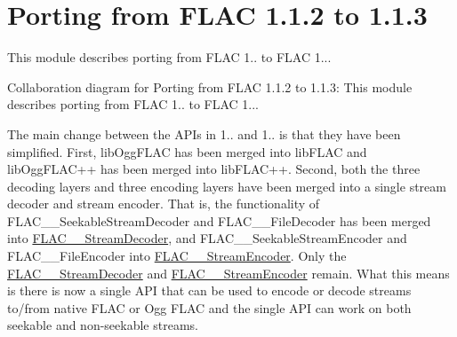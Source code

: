 \hypertarget{group__porting__1__1__2__to__1__1__3}{}\section{Porting from F\+L\+AC 1.1.2 to 1.1.3}
\label{group__porting__1__1__2__to__1__1__3}


This module describes porting from F\+L\+AC 1.. to F\+L\+AC 1...  


Collaboration diagram for Porting from F\+L\+AC 1.1.2 to 1.1.3\+:
This module describes porting from F\+L\+AC 1.. to F\+L\+AC 1... 

The main change between the A\+P\+Is in 1.. and 1.. is that they have been simplified. First, lib\+Ogg\+F\+L\+AC has been merged into lib\+F\+L\+AC and lib\+Ogg\+F\+L\+A\+C++ has been merged into lib\+F\+L\+A\+C++. Second, both the three decoding layers and three encoding layers have been merged into a single stream decoder and stream encoder. That is, the functionality of F\+L\+A\+C\+\_\+\+\_\+\+Seekable\+Stream\+Decoder and F\+L\+A\+C\+\_\+\+\_\+\+File\+Decoder has been merged into \hyperlink{struct_f_l_a_c_____stream_decoder}{F\+L\+A\+C\+\_\+\+\_\+\+Stream\+Decoder}, and F\+L\+A\+C\+\_\+\+\_\+\+Seekable\+Stream\+Encoder and F\+L\+A\+C\+\_\+\+\_\+\+File\+Encoder into \hyperlink{struct_f_l_a_c_____stream_encoder}{F\+L\+A\+C\+\_\+\+\_\+\+Stream\+Encoder}. Only the \hyperlink{struct_f_l_a_c_____stream_decoder}{F\+L\+A\+C\+\_\+\+\_\+\+Stream\+Decoder} and \hyperlink{struct_f_l_a_c_____stream_encoder}{F\+L\+A\+C\+\_\+\+\_\+\+Stream\+Encoder} remain. What this means is there is now a single A\+PI that can be used to encode or decode streams to/from native F\+L\+AC or Ogg F\+L\+AC and the single A\+PI can work on both seekable and non-\/seekable streams.

